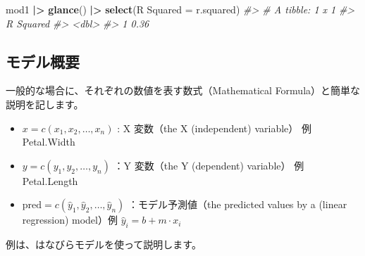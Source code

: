 \documentclass[
  xelatex, ja=standard]{bxjsbook}
\newenvironment{Shaded}{\begin{snugshade}}{\end{snugshade}}
\newcommand{\AttributeTok}[1]{\textcolor[rgb]{0.13,0.29,0.53}{#1}}
\newcommand{\CommentTok}[1]{\textcolor[rgb]{0.56,0.35,0.01}{\textit{#1}}}
\newcommand{\FunctionTok}[1]{\textcolor[rgb]{0.13,0.29,0.53}{\textbf{#1}}}
\newcommand{\NormalTok}[1]{#1}
\newcommand{\OtherTok}[1]{\textcolor[rgb]{0.56,0.35,0.01}{#1}}
\newcommand{\SpecialCharTok}[1]{\textcolor[rgb]{0.81,0.36,0.00}{\textbf{#1}}}
\newcommand{\StringTok}[1]{\textcolor[rgb]{0.31,0.60,0.02}{#1}}
\providecommand{\tightlist}{%
  \setlength{\itemsep}{0pt}\setlength{\parskip}{0pt}}
\theoremstyle{definition}
\theoremstyle{definition}
\theoremstyle{definition}
\theoremstyle{definition}
\theoremstyle{remark}
\begin{document}
\begin{Shaded}
\begin{Highlighting}[]
\NormalTok{mod1 }\SpecialCharTok{|\textgreater{}} \FunctionTok{glance}\NormalTok{() }\SpecialCharTok{|\textgreater{}} \FunctionTok{select}\NormalTok{(}\StringTok{\textasciigrave{}}\AttributeTok{R Squared}\StringTok{\textasciigrave{}} \OtherTok{=}\NormalTok{ r.squared)}
\CommentTok{\#\textgreater{} \# A tibble: 1 x 1}
\CommentTok{\#\textgreater{}   \textasciigrave{}R Squared\textasciigrave{}}
\CommentTok{\#\textgreater{}         \textless{}dbl\textgreater{}}
\CommentTok{\#\textgreater{} 1        0.36}
\end{Highlighting}
\end{Shaded}

\hypertarget{ux30e2ux30c7ux30ebux6982ux8981}{%
\subsection{モデル概要}\label{ux30e2ux30c7ux30ebux6982ux8981}}

一般的な場合に、それぞれの数値を表す数式（Mathematical Formula）と簡単な説明を記します。

\begin{itemize}
\tightlist
\item
  \(x = c(x_1, x_2, \ldots, x_n)\) : X 変数（the X (independent) variable） 例 Petal.Width
\item
  \(y = c(y_1, y_2, \ldots, y_n)\) ：Y 変数（the Y (dependent) variable） 例 Petal.Length
\item
  \(\mbox{pred} = c(\hat{y}_1, \hat{y}_2, \ldots, \hat{y}_n)\) ：モデル予測値（the predicted values by a (linear regression) model）例 \(\hat{y}_i = b + m\cdot x_i\)
\end{itemize}

例は、はなびらモデルを使って説明します。
\end{document}
